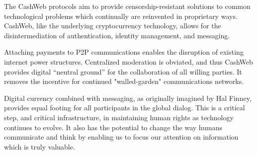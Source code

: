 \documentclass{article}
\begin{document}
The CashWeb protocols aim to provide censorship-resistant solutions to common technological problems which continually are reinvented in proprietary ways. CashWeb, like the underlying cryptocurrency technology, allows for the disintermediation of authentication, identity management, and messaging.

Attaching payments to P2P communications enables the disruption of existing internet power structures. Centralized moderation is obviated, and thus CashWeb provides digital ``neutral ground'' for the collaboration of all willing parties. It removes the incentive for continued "walled-garden" communications networks.

Digital currency combined with messaging, as originally imagined by Hal Finney\cite{finney2004rpow}, provides equal footing for all participants in the global dialog. This is a critical step, and critical infrastructure, in maintaining human rights as technology continues to evolve. It also has the potential to change the way humans communicate and think by enabling us to focus our attention on information which is truly valuable.
\cite{nakamoto2008bpp}



\end{document}
